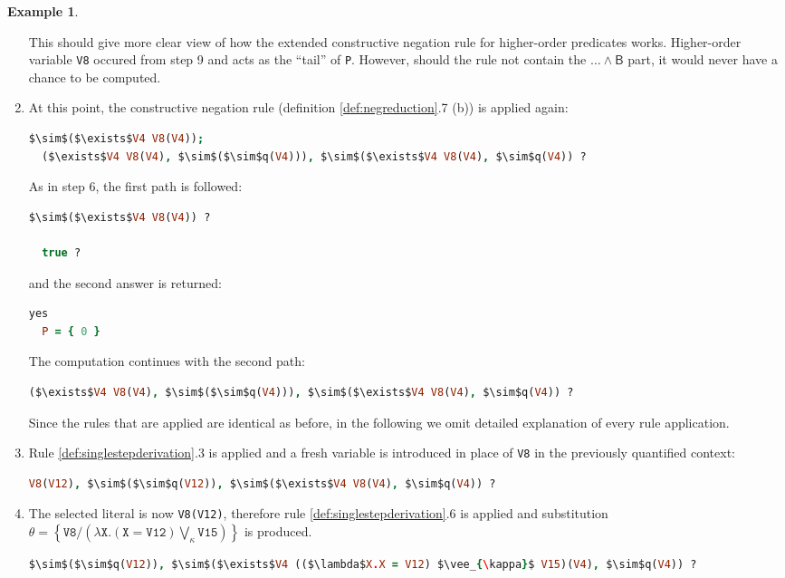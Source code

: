 \documentclass[inscr,ack,preface]{dithesis}
\theoremstyle{definition}
\newtheorem{example}{Example}[chapter]
\newcommand{\msf}[1]{$\mathsf{#1}$}
\begin{document}
\begin{example}
\begin{enumerate}
This should give more clear view of how the extended constructive negation rule for higher-order predicates works. Higher-order variable \texttt{V8} occured from step 9 and acts as the ``tail'' of \texttt{P}. However, should the rule not contain the \msf{\dots \land B} part, it would never have a chance to be computed.

\item At this point, the constructive negation rule (definition \ref{def:negreduction}.7 (b)) is applied again:
\begin{lstlisting}[language=Prolog,%
  frame=single,breaklines=false,mathescape=true]
  $\sim$($\exists$V4 V8(V4));
  ($\exists$V4 V8(V4), $\sim$($\sim$q(V4))), $\sim$($\exists$V4 V8(V4), $\sim$q(V4)) ?
\end{lstlisting}

As in step 6, the first path is followed:
\begin{lstlisting}[language=Prolog,%
  frame=single,breaklines=false,mathescape=true]
  $\sim$($\exists$V4 V8(V4)) ?

  true ?
\end{lstlisting}

and the second answer is returned:
\begin{lstlisting}[language=Prolog,%
  frame=single,breaklines=false,mathescape=true]
  yes
  P = { 0 }
\end{lstlisting}

The computation continues with the second path:
\begin{lstlisting}[language=Prolog,%
  frame=single,breaklines=false,mathescape=true]
  ($\exists$V4 V8(V4), $\sim$($\sim$q(V4))), $\sim$($\exists$V4 V8(V4), $\sim$q(V4)) ?
\end{lstlisting}

Since the rules that are applied are identical as before, in the following we omit detailed explanation of every rule application.

\item Rule \ref{def:singlestepderivation}.3 is applied and a fresh variable is introduced in place of \texttt{V8} in the previously quantified context:
\begin{lstlisting}[language=Prolog,%
  frame=single,breaklines=false,mathescape=true]
  V8(V12), $\sim$($\sim$q(V12)), $\sim$($\exists$V4 V8(V4), $\sim$q(V4)) ?
\end{lstlisting}

\item The selected literal is now \texttt{V8(V12)}, therefore rule \ref{def:singlestepderivation}.6 is applied and substitution \msf{\theta = \left\{ \texttt{V8} / \left( \lambda \texttt{X}. (\texttt{X} = \texttt{V12}) \bigvee_{\kappa} \texttt{V15} \right) \right\}} is produced.
\begin{lstlisting}[language=Prolog,%
  frame=single,breaklines=false,mathescape=true]
  $\sim$($\sim$q(V12)), $\sim$($\exists$V4 (($\lambda$X.X = V12) $\vee_{\kappa}$ V15)(V4), $\sim$q(V4)) ?
\end{lstlisting}


\end{enumerate}
\end{example}
\end{document}
